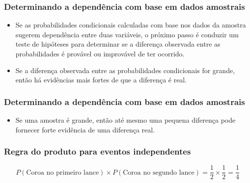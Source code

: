 
\begin{frame}
\frametitle{Determinando a dependência com base em dados amostrais}

\begin{itemize}
\justifying
\item Se as probabilidades condicionais calculadas com base nos dados da amostra sugerem dependência entre duas variáveis, o próximo passo é conduzir um teste de hipóteses para determinar se a diferença observada entre as probabilidades é provável ou improvável de ter ocorrido.
\justifying
\item Se a diferença observada entre as probabilidades condicionais for grande, então há evidências mais fortes de que a diferença é real.
\end{itemize}
\end{frame}


\begin{frame}
\frametitle{Determinando a dependência com base em dados amostrais}

\begin{itemize}
\justifying
\item Se uma amostra é grande, então até mesmo uma pequena diferença pode fornecer forte evidência de uma diferença real.

\end{itemize}

\pause
\justifying
{} \pause {}

\end{frame}


\begin{frame}
\frametitle{Regra do produto para eventos independentes}
\justifying
{}

\pause
\justifying
{}

\pause
\justifying
\[ P(\text{Coroa no primeiro lance}) \times  P(\text{Coroa no segundo lance}) = \frac{1}{2} \times \frac{1}{2} = \frac{1}{4} \]

\end{frame}

